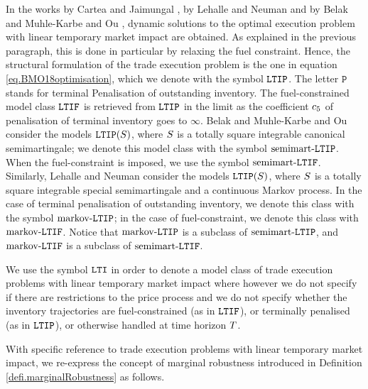 \documentclass[10pt,a4paper]{article}
\begin{document}
	In the works by Cartea and Jaimungal \cite{CJ16inc}, by Lehalle and Neuman \cite{LN19inc} and by Belak and Muhle-Karbe and Ou \cite{BMO18opt}, dynamic solutions to the optimal execution problem with linear temporary market impact are obtained. As explained in the previous  paragraph, this is done in particular by relaxing the fuel constraint. Hence, the structural formulation of the trade execution problem is the one in equation \eqref{eq.BMO18optimisation}, which we denote with the symbol $\mathtt{LTIP}$. The letter $\mathtt{P}$ stands for terminal Penalisation of outstanding inventory. The fuel-constrained model class $\mathtt{LTIF}$ is retrieved from $\mathtt{LTIP}$ in the limit as the coefficient $c_{5}$ of penalisation of terminal inventory goes to $\infty$.  Belak and Muhle-Karbe and Ou \cite{BMO18opt} consider  the models $\mathtt{LTIP}(S)$, where $S$ is a totally square integrable canonical semimartingale; we denote this model class with the symbol $\text{semimart-}\mathtt{LTIP}$. When the fuel-constraint is imposed, we use the symbol $\text{semimart-}\mathtt{LTIF}$. Similarly,  Lehalle and Neuman \cite{LN19inc} consider  the models $\mathtt{LTIP}(S)$, where $S$ is a totally square integrable special semimartingale and a continuous Markov process. In the case of terminal penalisation of outstanding inventory, we denote this class with the symbol $\text{markov-}\mathtt{LTIP}$; in the case of fuel-constraint, we denote this class with $\text{markov-}\mathtt{LTIF}$.  Notice that $\text{markov-}\mathtt{LTIP}$ is a subclass of $\text{semimart-}\mathtt{LTIP}$, and $\text{markov-}\mathtt{LTIF}$ is a subclass of $\text{semimart-}\mathtt{LTIF}$.
	
	We use the symbol $\mathtt{LTI}$ in order to denote a model class of trade execution problems with linear temporary market impact where however we do not specify if there are restrictions to the price process and we do not specify whether the inventory trajectories are fuel-constrained (as in $\mathtt{LTIF}$), or terminally penalised (as in $\mathtt{LTIP}$), or otherwise handled at  time horizon $T$.
	
	With specific reference to trade execution problems with linear temporary market impact, we re-express the concept of marginal robustness introduced in Definition \ref{defi.marginalRobustness}  as follows.
	
\end{document}
